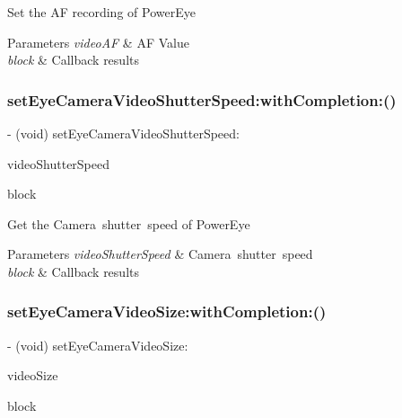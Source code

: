 Set the AF recording of Power\+Eye


\begin{DoxyParams}{Parameters}
{\em video\+AF} & AF Value \\
\hline
{\em block} & Callback results \\
\hline
\end{DoxyParams}
\mbox{\label{interface_p_v_camera_adb18da43aad108990528a3a56bb0cd13}} 
\subsubsection{\texorpdfstring{set\+Eye\+Camera\+Video\+Shutter\+Speed\+:with\+Completion\+:()}{setEyeCameraVideoShutterSpeed:withCompletion:()}}
{\footnotesize\ttfamily -\/ (void) set\+Eye\+Camera\+Video\+Shutter\+Speed\+: \begin{DoxyParamCaption}\item[{(P\+V\+Camera\+Video\+Shutter\+Speed)}]{video\+Shutter\+Speed }\item[{withCompletion:(P\+V\+Completion\+Block)}]{block }\end{DoxyParamCaption}}

Get the Camera shutter speed of Power\+Eye


\begin{DoxyParams}{Parameters}
{\em video\+Shutter\+Speed} & Camera shutter speed \\
\hline
{\em block} & Callback results \\
\hline
\end{DoxyParams}
\mbox{\label{interface_p_v_camera_a0e79c751fd196206a1fc3735cb91dacb}} 
\subsubsection{\texorpdfstring{set\+Eye\+Camera\+Video\+Size\+:with\+Completion\+:()}{setEyeCameraVideoSize:withCompletion:()}}
{\footnotesize\ttfamily -\/ (void) set\+Eye\+Camera\+Video\+Size\+: \begin{DoxyParamCaption}\item[{(P\+V\+Camera\+Video\+Size)}]{video\+Size }\item[{withCompletion:(P\+V\+Completion\+Block)}]{block }\end{DoxyParamCaption}}


